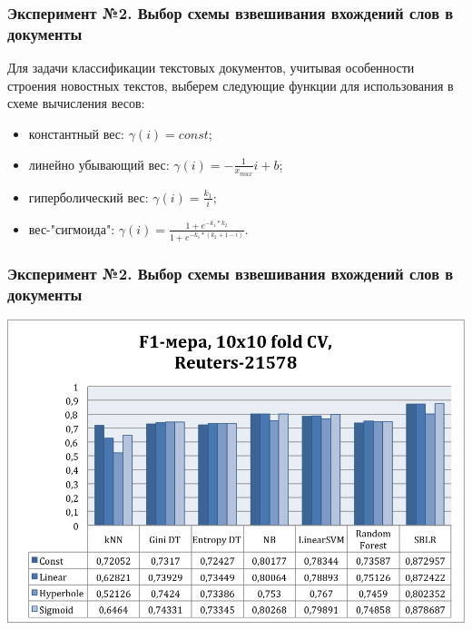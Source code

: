 \documentclass{beamer}
\begin{document}
\begin{frame}
\frametitle{Эксперимент №2. Выбор схемы взвешивания вхождений слов в документы}
Для задачи классификации текстовых документов, учитывая особенности строения новостных текстов,
выберем следующие функции для использования в схеме вычисления весов:
\newline
\\
\begin{itemize}
	\item{константный вес: $\gamma(i)=const$;}
	\item{линейно убывающий вес: $\gamma(i)=-\frac{1}{x_{max}}i+b$;}
	\item{гиперболический вес: $\gamma(i)=\frac{k_1}{i}$;}
	\item{вес-"сигмоида": $\gamma(i)=\frac{1+e^{-k_1*k_2}}{1+e^{-k_1*(k_2+1-i)}}$.}
\end{itemize}
\end{frame}

\begin{frame}
\frametitle{Эксперимент №2. Выбор схемы взвешивания вхождений слов в документы}
\begin{center}
    \includegraphics[width=\linewidth,height=0.7\textheight,align=\center, trim=4 4 4 4, clip, keepaspectratio]{weighting.png}
\end{center}
\end{frame}
\end{document}
